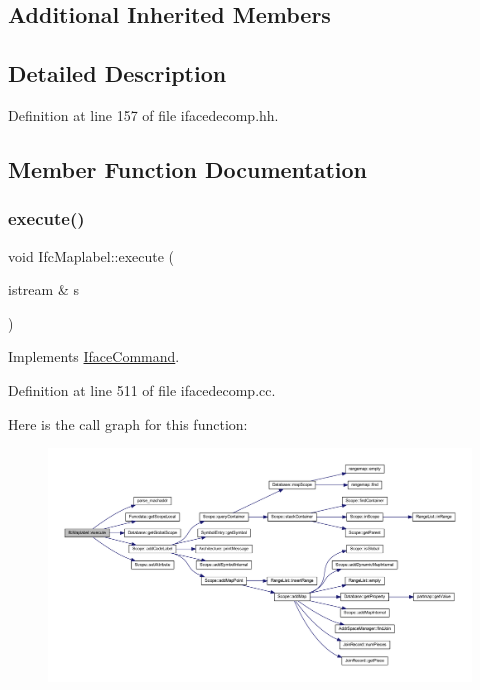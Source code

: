 \subsection*{Additional Inherited Members}


\subsection{Detailed Description}


Definition at line 157 of file ifacedecomp.\+hh.



\subsection{Member Function Documentation}
\mbox{\label{class_ifc_maplabel_a14a4b538cfef0467342d45812b5dfbdd}} 
\subsubsection{\texorpdfstring{execute()}{execute()}}
{\footnotesize\ttfamily void Ifc\+Maplabel\+::execute (\begin{DoxyParamCaption}\item[{istream \&}]{s }\end{DoxyParamCaption})\hspace{0.3cm}{\ttfamily [virtual]}}



Implements \mbox{\hyperlink{class_iface_command_af10e29cee2c8e419de6efe9e680ad201}{Iface\+Command}}.



Definition at line 511 of file ifacedecomp.\+cc.

Here is the call graph for this function\+:
\nopagebreak
\begin{figure}[H]
\begin{center}
\leavevmode
\includegraphics[width=350pt]{class_ifc_maplabel_a14a4b538cfef0467342d45812b5dfbdd_cgraph}
\end{center}
\end{figure}


